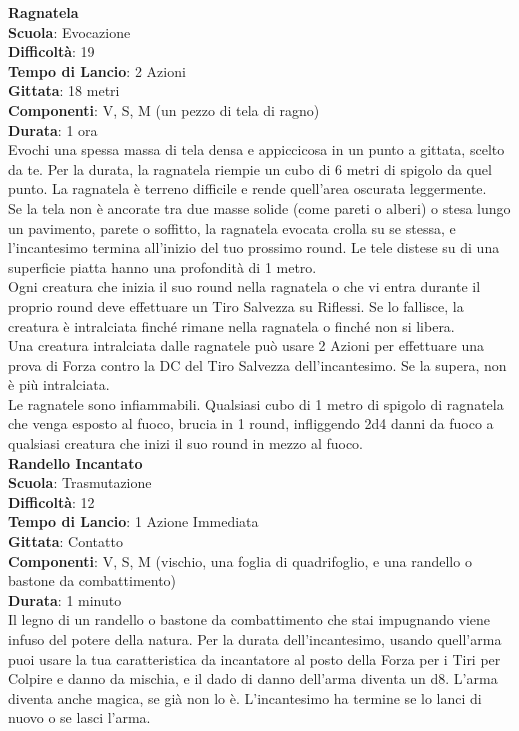 \begin{multicols}{2}
\medskip\textbf{Ragnatela}\\
\textbf{Scuola}: Evocazione\\
\textbf{Difficoltà}: 19\\
\textbf{Tempo di Lancio}: 2 Azioni\\
\textbf{Gittata}: 18 metri\\
\textbf{Componenti}: V, S, M (un pezzo di tela di ragno)\\
\textbf{Durata}: 1 ora\\
Evochi una spessa massa di tela densa e appiccicosa in un punto a gittata, scelto da te. Per la durata, la ragnatela riempie un cubo di 6 metri di spigolo da quel punto. La ragnatela è terreno difficile e rende quell'area oscurata leggermente.\\
Se la tela non è ancorate tra due masse solide (come pareti o alberi) o stesa lungo un pavimento, parete o soffitto, la ragnatela evocata crolla su se stessa, e l'incantesimo termina all'inizio del tuo prossimo round. Le tele distese su di una superficie piatta hanno una profondità di 1 metro.\\
Ogni creatura che inizia il suo round nella ragnatela o che vi entra durante il proprio round deve effettuare un Tiro Salvezza su Riflessi. Se lo fallisce, la creatura è intralciata finché rimane nella ragnatela o finché non si libera.\\
Una creatura intralciata dalle ragnatele può usare 2 Azioni per effettuare una prova di Forza contro la DC del Tiro Salvezza dell'incantesimo. Se la supera, non è più intralciata.\\
Le ragnatele sono infiammabili. Qualsiasi cubo di 1 metro di spigolo di ragnatela che venga esposto al fuoco, brucia in 1 round, infliggendo 2d4 danni da fuoco a qualsiasi creatura che inizi il suo round in mezzo al fuoco.\\

\medskip\textbf{Randello Incantato}\\
\textbf{Scuola}: Trasmutazione\\
\textbf{Difficoltà}: 12\\
\textbf{Tempo di Lancio}: 1 Azione Immediata\\
\textbf{Gittata}: Contatto\\
\textbf{Componenti}: V, S, M (vischio, una foglia di quadrifoglio, e una randello o bastone da combattimento)\\
\textbf{Durata}: 1 minuto\\
Il legno di un randello o bastone da combattimento che stai impugnando viene infuso del potere della natura. Per la durata dell'incantesimo, usando quell'arma puoi usare la tua caratteristica da incantatore al posto della Forza per i Tiri per Colpire e danno da mischia, e il dado di danno dell'arma diventa un d8. L'arma diventa anche magica, se già non lo è. L'incantesimo ha termine se lo lanci di nuovo o se lasci l'arma.


\end{multicols}
